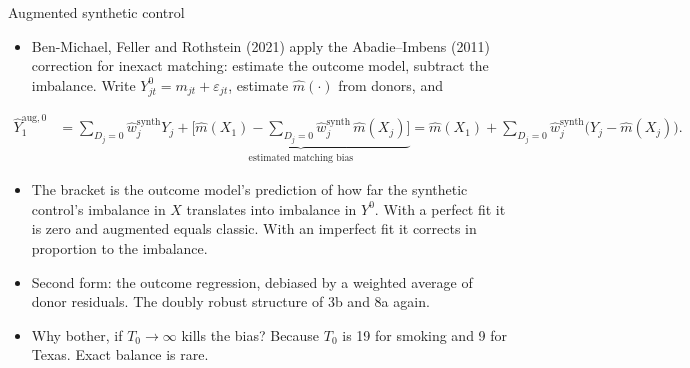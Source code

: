 \documentclass[
  11pt,
  ignorenonframetext,
  aspectratio=169,
]{beamer}
\providecommand{\tightlist}{%
  \setlength{\itemsep}{0pt}\setlength{\parskip}{0pt}}
\begin{document}
\begin{frame}{Augmented synthetic control}
\protect{}\label{augmented-synthetic-control}
\begin{itemize}
\tightlist
\item
  Ben-Michael, Feller and Rothstein (2021) apply the Abadie--Imbens
  (2011) correction for inexact matching: estimate the outcome model,
  subtract the imbalance. Write
  \(Y^0_{jt} = m_{jt} + \varepsilon_{jt}\), estimate \(\hat m(\cdot)\)
  from donors, and
\end{itemize}

\small

\[
\begin{aligned}
\hat Y^{\text{aug},0}_{1} &= \textstyle\sum_{D_j = 0} \hat w_j^{\text{synth}} Y_j + \underbrace{\big[ \hat m(X_1) - \sum_{D_j = 0} \hat w_j^{\text{synth}}\, \hat m(X_j) \big]}_{\text{estimated matching bias}}
= \hat m(X_1) + \sum_{D_j = 0} \hat w_j^{\text{synth}} \big( Y_j - \hat m(X_j) \big).
\end{aligned}
\] \normalsize

\begin{itemize}
\tightlist
\item
  The bracket is the outcome model's prediction of how far the synthetic
  control's imbalance in \(X\) translates into imbalance in \(Y^0\).
  With a perfect fit it is zero and augmented equals classic. With an
  imperfect fit it corrects in proportion to the imbalance.
\item
  Second form: the outcome regression, debiased by a weighted average of
  donor residuals. The doubly robust structure of 3b and 8a again.
\item
  Why bother, if \(T_0 \to \infty\) kills the bias? Because \(T_0\) is
  19 for smoking and 9 for Texas. Exact balance is rare.
\end{itemize}
\end{frame}
\end{document}
